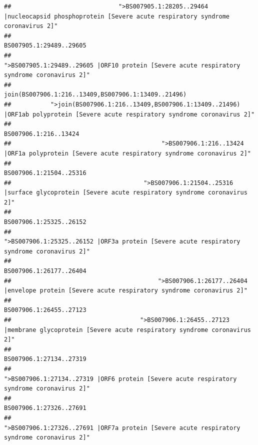 \documentclass[
]{article}
\begin{document}
\begin{verbatim}
##                              ">BS007905.1:28205..29464 |nucleocapsid phosphoprotein [Severe acute respiratory syndrome coronavirus 2]" 
##                                                                                                                BS007905.1:29489..29605 
##                                            ">BS007905.1:29489..29605 |ORF10 protein [Severe acute respiratory syndrome coronavirus 2]" 
##                                                                                    join(BS007906.1:216..13409,BS007906.1:13409..21496) 
##           ">join(BS007906.1:216..13409,BS007906.1:13409..21496) |ORF1ab polyprotein [Severe acute respiratory syndrome coronavirus 2]" 
##                                                                                                                  BS007906.1:216..13424 
##                                          ">BS007906.1:216..13424 |ORF1a polyprotein [Severe acute respiratory syndrome coronavirus 2]" 
##                                                                                                                BS007906.1:21504..25316 
##                                     ">BS007906.1:21504..25316 |surface glycoprotein [Severe acute respiratory syndrome coronavirus 2]" 
##                                                                                                                BS007906.1:25325..26152 
##                                            ">BS007906.1:25325..26152 |ORF3a protein [Severe acute respiratory syndrome coronavirus 2]" 
##                                                                                                                BS007906.1:26177..26404 
##                                         ">BS007906.1:26177..26404 |envelope protein [Severe acute respiratory syndrome coronavirus 2]" 
##                                                                                                                BS007906.1:26455..27123 
##                                    ">BS007906.1:26455..27123 |membrane glycoprotein [Severe acute respiratory syndrome coronavirus 2]" 
##                                                                                                                BS007906.1:27134..27319 
##                                             ">BS007906.1:27134..27319 |ORF6 protein [Severe acute respiratory syndrome coronavirus 2]" 
##                                                                                                                BS007906.1:27326..27691 
##                                            ">BS007906.1:27326..27691 |ORF7a protein [Severe acute respiratory syndrome coronavirus 2]" 

\end{verbatim}
\end{document}
